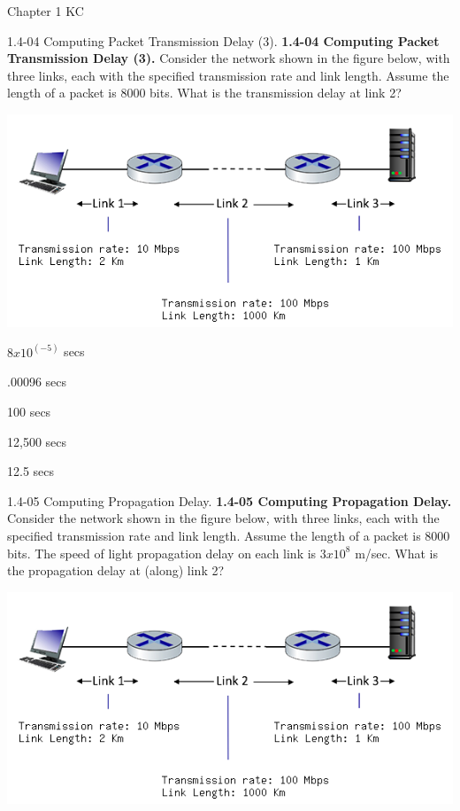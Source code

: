 \documentclass[a4paper]{article}
\begin{document}
\begin{quiz}{Chapter 1 KC}
\begin{multi}[points=1]{1.4-04 Computing Packet Transmission Delay (3).}
\textbf{1.4-04 Computing Packet Transmission Delay (3).} 
Consider the network shown in the figure below, with three links, each with the specified transmission rate and link length. Assume the length of a packet is 8000 bits. What is the transmission delay at link 2? 
\begin{center}
\includegraphics[width=\linewidth]{figs/1.4.4.png}
\end{center}
\item* $8 x 10^(-5)$ secs
\item .00096 secs
\item 100 secs
\item 12,500 secs
\item 12.5 secs
\end{multi}

\begin{multi}[points=1]{1.4-05 Computing Propagation Delay.}
\textbf{1.4-05 Computing Propagation Delay.} 
Consider the network shown in the figure below, with three links, each with the specified transmission rate and link length. Assume the length of a packet is 8000 bits. The speed of light propagation delay on each link is $3x10^8$ m/sec.
What is the propagation delay at (along) link 2? 
\begin{center}
\includegraphics[width=\linewidth]{figs/1.4.4.png}
\end{center}


\end{multi}
\end{quiz}
\end{document}
